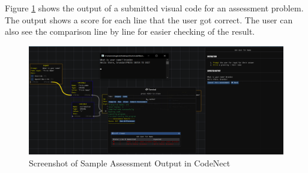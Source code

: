\parx
Figure \ref{fig:cn_assessment_run} shows the output of a submitted visual code for
an assessment problem. The output shows a score for each line that the user got
correct. The user can also see the comparison line by line for easier checking of
the result.

\begin{figure}[H]
	\centering
	\captionsetup{justification=centering}
	\captionsetup[figure]{list=yes}
	\includegraphics[width=\linewidth]{media/sc_assessments_run.png}
	\caption[Screenshot of Sample Assessment Output in CodeNect]{Screenshot of Sample Assessment Output in CodeNect}
	\label{fig:cn_assessment_run}
\end{figure}
